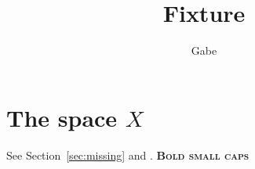 \documentclass[nonexistentoption]{article}
\title{Fixture}
\author{Gabe}
\begin{document}
\maketitle

\section{The space $X$}\label{sec:space}
See Section~\ref{sec:missing} and \cite{nokey}.
\textbf{\textsc{Bold small caps}}

\label{sec:space}
\end{document}
